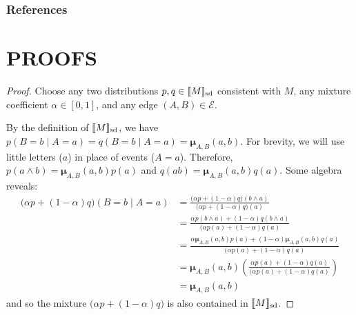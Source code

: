 \documentclass{article}
\newcommand\SD{_{\text{sd}}}
\newcommand{\bmu}{\boldsymbol{\mu}}
\newcommand{\Ed}{\mathcal E}
\numberwithin{equation}{section}
\begin{document}
	\subsubsection*{References}
	\printbibliography[heading=none]
	
	\onecolumn
	\appendix
	
	\section{PROOFS}
	\thmsetconvex*
	\begin{proof}
		Choose any two distributions $p, q \in \bbr{M}\SD$ consistent with $M$, any mixture coefficient $\alpha \in [0,1]$, and any edge $(A,B) \in \Ed$.
		
		By the definition of $\bbr{M}\SD$, we have $p(B = b \mid A = a) = q(B = b \mid A = a) = \bmu_{A,B}(a,b)$.  
		For brevity, we will use little letters ($a$) in place of events ($A = a$).
		Therefore, $p(a\land b) = \bmu_{A,B}(a,b) p(a)$ and $q(ab) = \bmu_{A,B}(a,b) q(a)$. Some algebra reveals:
		\begin{align*}
			\Big( \alpha p + (1-\alpha) q \Big) (B = b \mid A = a) &= 
			\frac{\Big( \alpha p + (1-\alpha) q \Big) (b \land a)}{\Big( \alpha p + (1-\alpha) q \Big) (a)} \\
			&= \frac{ \alpha p(b \land a) + (1-\alpha) q(b \land a) }{\Big( \alpha p(a) + (1-\alpha) q (a)} \\
			&= \frac{ \alpha \bmu_{A,B}(a,b) p(a) + (1-\alpha) \bmu_{A,B}(a,b) q(a) }{\Big( \alpha p(a) + (1-\alpha) q (a)} \\
			&=\bmu_{A,B}(a,b) \left(\frac{ \alpha  p(a) + (1-\alpha) q(a) }{\Big( \alpha p(a) + (1-\alpha) q (a)}\right)\\
			&= \bmu_{A,B}(a,b)
		\end{align*}
		and so the mixture $\Big(\alpha p + (1-\alpha) q \Big)$ is also contained in $\bbr{M}\SD$.
	\end{proof}
	
\end{document}
